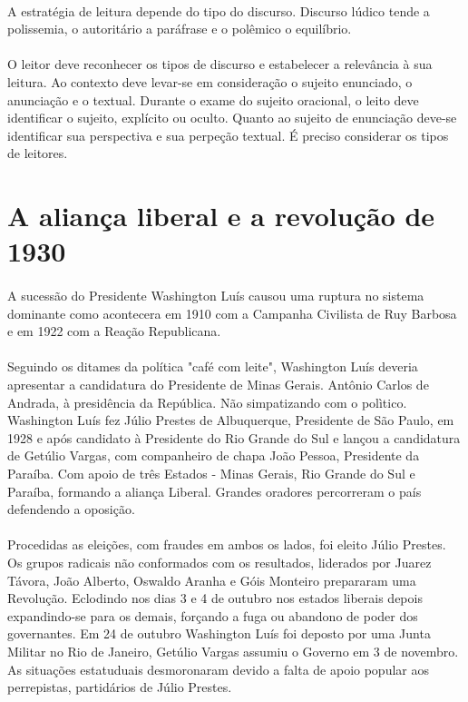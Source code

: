 \paragraph{}
A estratégia de leitura depende do tipo do discurso.
Discurso lúdico tende a polissemia, o autoritário a paráfrase e o polêmico o equilíbrio.
\paragraph{}
O leitor deve reconhecer os tipos de discurso e estabelecer a relevância à sua leitura. 
Ao contexto deve levar-se em consideração o sujeito enunciado, o anunciação e o textual. Durante o exame do sujeito oracional, o leito deve identificar o sujeito, explícito ou oculto. Quanto ao sujeito de enunciação deve-se identificar sua perspectiva e sua perpeção textual. 
É preciso considerar os tipos de leitores. 

\section{A aliança liberal e a revolução de 1930}

\paragraph{}
A sucessão do Presidente Washington Luís causou uma ruptura no sistema dominante como acontecera em 1910 com a Campanha Civilista de Ruy Barbosa e em 1922 com a Reação Republicana.

\paragraph{}
Seguindo os ditames da política "café com leite", Washington Luís deveria apresentar a candidatura do Presidente de Minas Gerais. Antônio Carlos de Andrada, à presidência da República. Não simpatizando com o polìtico. Washington Luís fez Júlio Prestes de Albuquerque, Presidente de São Paulo, em 1928 e após candidato à Presidente do Rio Grande do Sul e lançou a candidatura de Getúlio Vargas, com companheiro de chapa João Pessoa, Presidente da Paraíba. Com apoio de três Estados - Minas Gerais, Rio Grande do Sul e Paraíba, formando a aliança Liberal. Grandes oradores percorreram o país defendendo a oposição.

\paragraph{}
Procedidas as eleições, com fraudes em ambos os lados, foi eleito Júlio Prestes. Os grupos radicais não conformados com os resultados, liderados por Juarez Távora, João Alberto, Oswaldo Aranha e Góis Monteiro prepararam uma Revolução. Eclodindo nos dias 3 e 4 de outubro nos estados liberais depois expandindo-se para os demais, forçando a fuga ou abandono de poder dos governantes. Em 24 de outubro Washington Luís foi deposto por uma Junta Militar no Rio de Janeiro, Getúlio Vargas assumiu o Governo em 3 de novembro. As situações estatuduais desmoronaram devido a falta de apoio popular aos perrepistas, partidários de Júlio Prestes.
